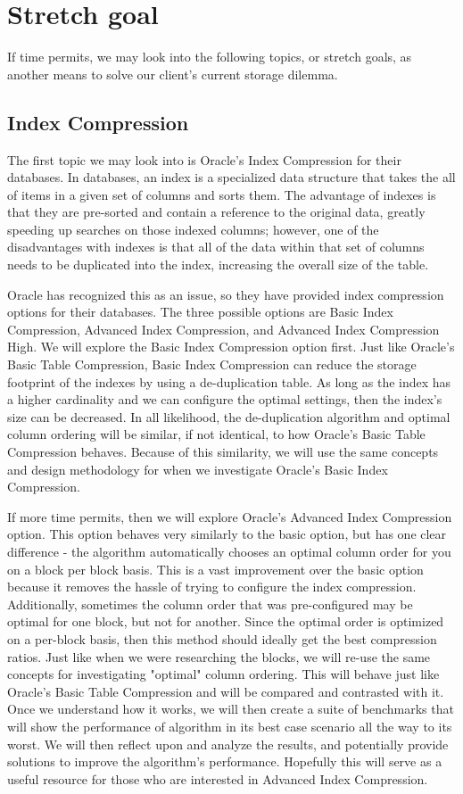 \documentclass[10pt]{article}
\begin{document}
\section{Stretch goal}
If time permits, we may look into the following topics, or stretch goals, as another means to solve our client's current storage dilemma.

\subsection{Index Compression}
The first topic we may look into is Oracle's Index Compression for their databases. In databases, an index is a specialized data structure that takes the all of items in a given set of columns and sorts them. The advantage of indexes is that they are pre-sorted and contain a reference to the original data, greatly speeding up searches on those indexed columns; however, one of the disadvantages with indexes is that all of the data within that set of columns needs to be duplicated into the index, increasing the overall size of the table.

Oracle has recognized this as an issue, so they have provided index compression options for their databases. The three possible options are Basic Index Compression, Advanced Index Compression, and Advanced Index Compression High. We will explore the Basic Index Compression option first. Just like Oracle's Basic Table Compression, Basic Index Compression can reduce the storage footprint of the indexes by using a de-duplication table. As long as the index has a higher cardinality and we can configure the optimal settings, then the index's size can be decreased. In all likelihood, the de-duplication algorithm and optimal column ordering will be similar, if not identical, to how Oracle's Basic Table Compression behaves. Because of this similarity, we will use the same concepts and design methodology for when we investigate Oracle's Basic Index Compression.

If more time permits, then we will explore Oracle's Advanced Index Compression option. This option behaves very similarly to the basic option, but has one clear difference - the algorithm automatically chooses an optimal column order for you on a block per block basis. This is a vast improvement over the basic option because it removes the hassle of trying to configure the index compression. Additionally, sometimes the column order that was pre-configured may be optimal for one block, but not for another. Since the optimal order is optimized on a per-block basis, then this method should ideally get the best compression ratios. Just like when we were researching the blocks, we will re-use the same concepts for investigating "optimal" column ordering. This will behave just like Oracle's Basic Table Compression and will be compared and contrasted with it. Once we understand how it works, we will then create a suite of benchmarks that will show the performance of algorithm in its best case scenario all the way to its worst. We will then reflect upon and analyze the results, and potentially provide solutions to improve the algorithm's performance. Hopefully this will serve as a useful resource for those who are interested in Advanced Index Compression.
\end{document}
